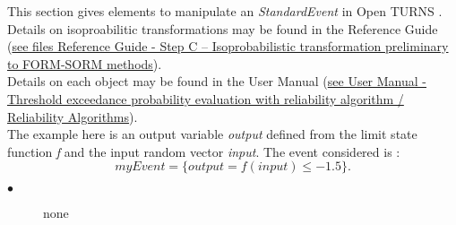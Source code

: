\renewcommand{\filename}{docUC_ThresholdExceedance_StandardEventManipulation.tex}
\renewcommand{\filetitle}{UC : Manipulation of a StandardEvent}

\HeaderIIILevel


This section gives elements to manipulate an {\itshape StandardEvent} in Open TURNS .\\



Details on isoproabilitic transformations  may be found in the Reference Guide (\href{OpenTURNS_ReferenceGuide.pdf}{see files Reference Guide - Step C -- Isoprobabilistic transformation preliminary to FORM-SORM methods}).\\


Details on each object may be found in the User Manual  (\href{OpenTURNS_UserManual_TUI.pdf}{see User Manual - Threshold exceedance probability evaluation with reliability algorithm / Reliability Algorithms}).\\

The example here is an output variable {\itshape output} defined from the limit state function {\itshape f} and the input random  vector {\itshape input}. The event considered is :
$$
myEvent = \{ output=f(input) \leq -1.5 \}.
$$

{
  \begin{description}
  \item[$\bullet$] none
  \end{description}
}


